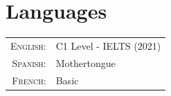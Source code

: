 \documentclass[a4paper,10pt]{article} %
\begin{document}
\section{Languages}
\bigskip
\begin{tabular}{rl}
	\textsc{English:} & C1 Level - IELTS (2021)\\
	\textsc{Spanish:} & Mothertongue \\
	\textsc{French:} & Basic
\end{tabular}

\end{document}
